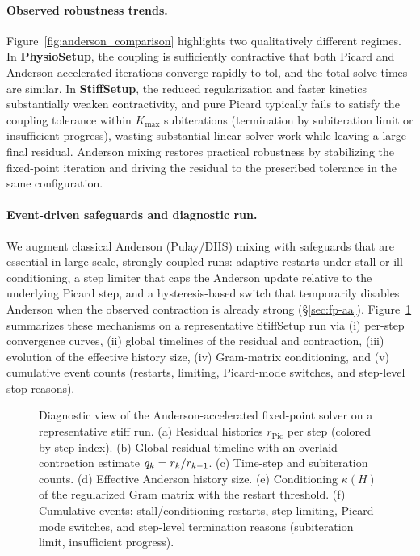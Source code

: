 \paragraph{Observed robustness trends.}
Figure~\ref{fig:anderson_comparison} highlights two qualitatively different regimes.
In \textbf{PhysioSetup}, the coupling is sufficiently contractive that both Picard and Anderson-accelerated iterations converge rapidly to $\mathrm{tol}$, and the total solve times are similar.
In \textbf{StiffSetup}, the reduced regularization and faster kinetics substantially weaken contractivity, and pure Picard typically fails to satisfy the coupling tolerance within $K_{\max}$ subiterations (termination by subiteration limit or insufficient progress), wasting substantial linear-solver work while leaving a large final residual.
Anderson mixing restores practical robustness by stabilizing the fixed-point iteration and driving the residual to the prescribed tolerance in the same configuration.
\paragraph{Event-driven safeguards and diagnostic run.}
We augment classical Anderson (Pulay/DIIS) mixing with safeguards that are essential in large-scale, strongly coupled runs:
adaptive restarts under stall or ill-conditioning, a step limiter that caps the Anderson update relative to the underlying Picard step, and a hysteresis-based switch that temporarily disables Anderson when the observed contraction is already strong (\S\ref{sec:fp-aa}).
Figure~\ref{fig:anderson_diagnostic} summarizes these mechanisms on a representative StiffSetup run via (i) per-step convergence curves, (ii) global timelines of the residual and contraction, (iii) evolution of the effective history size, (iv) Gram-matrix conditioning, and (v) cumulative event counts (restarts, limiting, Picard-mode switches, and step-level stop reasons).
  
\begin{figure}[htbp]
  \centering
  \caption{Diagnostic view of the Anderson-accelerated fixed-point solver on a representative stiff run.
  (a) Residual histories $r_{\mathrm{Pic}}$ per step (colored by step index).
  (b) Global residual timeline with an overlaid contraction estimate $q_k=r_k/r_{k-1}$.
  (c) Time-step and subiteration counts.
  (d) Effective Anderson history size.
  (e) Conditioning $\kappa(H)$ of the regularized Gram matrix with the restart threshold.
  (f) Cumulative events: stall/conditioning restarts, step limiting, Picard-mode switches, and step-level termination reasons (subiteration limit, insufficient progress).}
  \label{fig:anderson_diagnostic}
\end{figure}

